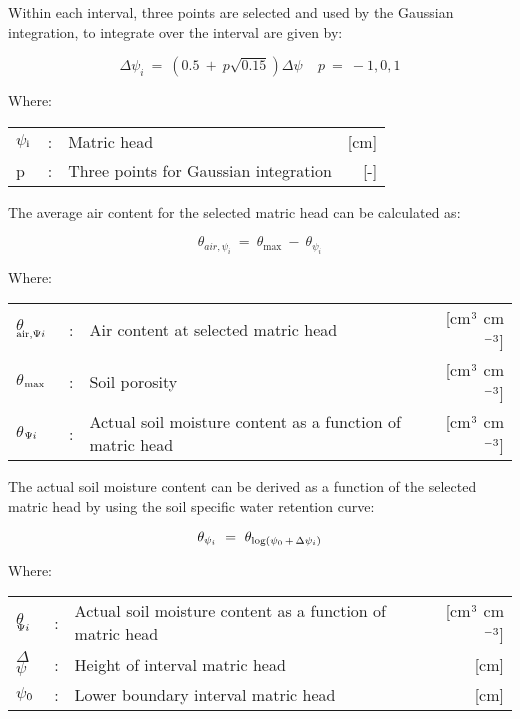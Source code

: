 Within each interval, three points are selected and used by the Gaussian integration, to
integrate over the interval are given by:

\begin{equation}
 \Delta  \psi _{i} ~=~ (0.5 ~+~ p \sqrt{0.15} ) \Delta  \psi ~~~~~p~=~-1,0,1
\end{equation}

Where:\\[5pt]
\begin{tabularx}{\textwidth}{llXr}
$\psi$$_{{\rm i}}$ &:& Matric head   & [cm]\\
p &:& Three points for Gaussian integration  & [-]\\
\end{tabularx}

The average air content for the selected matric head can be calculated as:

\begin{equation}
\theta  _{air, \psi _{i} } ~=~ \theta _{\max } ~-~ \theta  _{\psi _{i} }
\end{equation}

Where:\\[5pt]
\begin{tabularx}{\textwidth}{llXr}
$\theta$$_{{\rm air,}{\rm \Psi}{i}}$ &:& Air content at selected matric head  & [cm$^{{\rm 3}}$ cm$^{{\rm -3}}$]\\
$\theta$$_{{\rm max}}$ &:& Soil porosity  & [cm$^{{\rm 3}}$ cm$^{{\rm -3}}$]\\
$\theta$$_{{\rm \Psi}{i}}$ &:& Actual soil moisture content as a function of matric head  & [cm$^{{\rm 3}}$ cm$^{{\rm -3}}$]\\
\end{tabularx}

The actual soil moisture content can be derived as a function of the selected matric head
by using the soil specific water retention curve:

\begin{equation}
\theta_{\psi _{i} } ~=~ \theta_{{\rm log} (\psi_{0} \, +\, \Delta  \psi_{i} )}
\end{equation}

Where:\\[5pt]
\begin{tabularx}{\textwidth}{llXr}
$\theta$$_{{\rm \Psi}{i}}$ &:& Actual soil moisture content as a function of 
    matric head  & [cm$^{{\rm 3}}$ cm$^{{\rm -3}}$]\\
$\Delta$$\psi$ &:& Height of interval matric head  & [cm]\\
$\psi$$_{{\rm 0}}$ &:& Lower boundary interval matric head  & [cm]\\
\end{tabularx}

